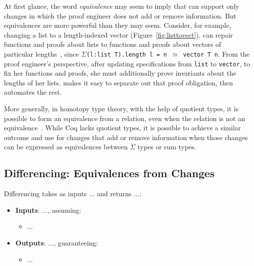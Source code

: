 At first glance, the word \textit{equivalence} may seem to imply that \toolnamec can support only changes in
which the proof engineer does not add or remove information.
But equivalences are more powerful than they may seem.
Consider, for example, changing a list to a length-indexed vector (Figure~\ref{fig:listtovect}).
\toolnamec can repair functions and proofs about lists to functions and proofs about vectors of particular lengths~\href{https://github.com/uwplse/pumpkin-pi/blob/v2.0.0/plugin/coq/examples/Example.v}{}, %
since $\Sigma$\lstinline{(l:list T).length l = n }$\simeq$\lstinline{ vector T n}.
From the proof engineer's perspective, after updating specifications from \lstinline{list} to \lstinline{vector},
to fix her functions and proofs, she must additionally prove invariants about the lengths of her lists.
\toolnamec makes it easy to separate out that proof obligation, then automates the rest.

More generally, in homotopy type theory, with the help of quotient types, it is possible to form an equivalence
from a relation, even when the relation is not an equivalence~\cite{angiuli2020internalizing}.
While Coq lacks quotient types,
it is possible to achieve a similar outcome and use \toolnamec for changes that add or remove information
when those changes can be expressed as equivalences between $\Sigma$ types or sum types.

\subsection{Differencing: Equivalences from Changes}
\label{sec:pi-spec-diff}

Differencing takes as inputs $\ldots$ and returns $\ldots$:

\begin{itemize}
\item \textbf{Inputs}: $\ldots$, assuming:
\begin{itemize}
\item $\ldots$
\end{itemize}
\item \textbf{Outputs}: $\ldots$, guaranteeing:
\begin{itemize}
\item $\ldots$
\end{itemize}
\end{itemize}

